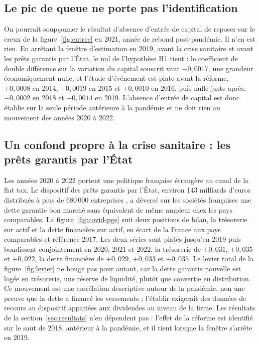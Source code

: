 

\subsection{Le pic de queue ne porte pas l'identification}

On pourrait soupçonner le résultat d'absence d'entrée de capital de reposer sur le creux de la
figure~\ref{fig:entree} en 2021, année de rebond post-pandémie. Il n'en est rien. En arrêtant la
fenêtre d'estimation en 2019, avant la crise sanitaire et avant les prêts garantis par l'État, le
nul de l'hypothèse H1 tient : le coefficient de double différence sur la variation du capital
souscrit vaut $-0{,}0017$, une grandeur économiquement nulle, et l'étude d'événement est plate avant
la réforme, $+0{,}0008$ en 2014, $+0{,}0019$ en 2015 et $+0{,}0010$ en 2016, puis nulle juste après,
$-0{,}0002$ en 2018 et $-0{,}0014$ en 2019. L'absence d'entrée de capital est donc établie sur la
seule période antérieure à la pandémie et ne doit rien au mouvement des années 2020 à 2022.

\subsection{Un confond propre à la crise sanitaire : les prêts garantis par l'État}

Les années 2020 à 2022 portent une politique française étrangère au canal de la flat tax. Le
dispositif des prêts garantis par l'État, environ 143 milliards d'euros distribués à plus de 680\,000 entreprises \citep{courdescomptes2022pge},
a déversé sur les sociétés françaises une dette garantie bon marché sans équivalent de même ampleur
chez les pays comparables. La figure~\ref{fig:covid-pge} suit deux positions de bilan, la trésorerie
sur actif et la dette financière sur actif, en écart de la France aux pays comparables et référence
2017. Les deux séries sont plates jusqu'en 2019 puis bondissent conjointement en 2020, 2021 et 2022,
la trésorerie de $+0{,}031$, $+0{,}035$ et $+0{,}022$, la dette financière de $+0{,}029$, $+0{,}033$
et $+0{,}035$. Le levier total de la figure~\ref{fig:levier} ne bouge pas pour autant, car la dette
garantie nouvelle est logée en trésorerie, une réserve de liquidité, plutôt que convertie en
distribution. Ce mouvement est une corrélation descriptive autour de la pandémie, non une preuve que
la dette a financé les versements ; l'établir exigerait des données de recours au dispositif
appariées aux dividendes au niveau de la firme. Les résultats de la section~\ref{sec:resultats} n'en
dépendent pas : l'effet de la réforme est identifié sur le saut de 2018, antérieur à la pandémie, et
il tient lorsque la fenêtre s'arrête en 2019.

